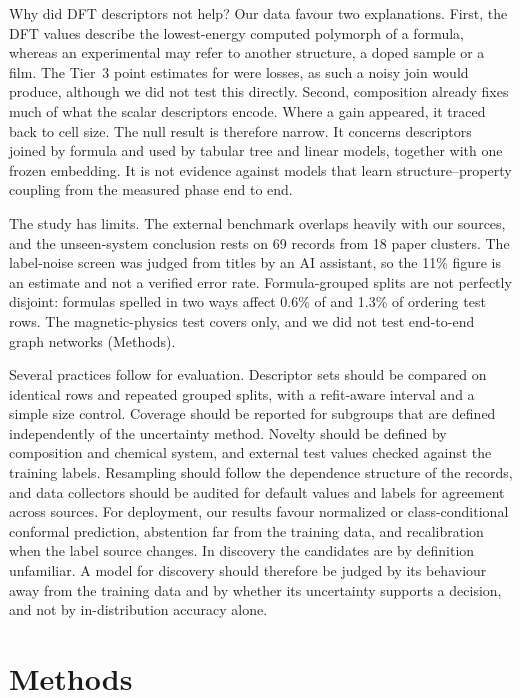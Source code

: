 \documentclass[11pt,a4paper]{article}
\begin{document}
Why did DFT descriptors not help? Our data favour two explanations. First, the DFT values describe the lowest-energy computed polymorph of a formula, whereas an experimental \Tc{} may refer to another structure, a doped sample or a film. The Tier~3 point estimates for \Tc{} were losses, as such a noisy join would produce, although we did not test this directly. Second, composition already fixes much of what the scalar descriptors encode. Where a gain appeared, it traced back to cell size. The null result is therefore narrow. It concerns descriptors joined by formula and used by tabular tree and linear models, together with one frozen embedding. It is not evidence against models that learn structure--property coupling from the measured phase end to end.

The study has limits. The external benchmark overlaps heavily with our sources, and the unseen-system conclusion rests on 69 records from 18 paper clusters. The label-noise screen was judged from titles by an AI assistant, so the 11\% figure is an estimate and not a verified error rate. Formula-grouped splits are not perfectly disjoint: formulas spelled in two ways affect 0.6\% of \Tc{} and 1.3\% of ordering test rows. The magnetic-physics test covers \Tc{} only, and we did not test end-to-end graph networks (Methods).

Several practices follow for evaluation. Descriptor sets should be compared on identical rows and repeated grouped splits, with a refit-aware interval and a simple size control. Coverage should be reported for subgroups that are defined independently of the uncertainty method. Novelty should be defined by composition and chemical system, and external test values checked against the training labels. Resampling should follow the dependence structure of the records, and data collectors should be audited for default values and labels for agreement across sources. For deployment, our results favour normalized or class-conditional conformal prediction, abstention far from the training data, and recalibration when the label source changes. In discovery the candidates are by definition unfamiliar. A model for discovery should therefore be judged by its behaviour away from the training data and by whether its uncertainty supports a decision, and not by in-distribution accuracy alone.

\section*{Methods}\label{sec:methods}
\end{document}
